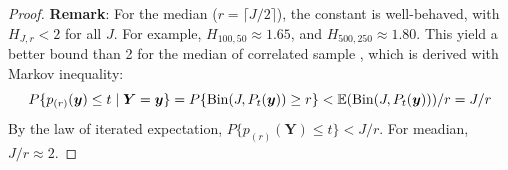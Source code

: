 \documentclass[
  12pt]{article}
\theoremstyle{plain}
\theoremstyle{definition}
\theoremstyle{remark}
\begin{document}
\begin{proof}
\noindent\textbf{Remark}: For the median ($r=\lceil J/2\rceil$), the constant is well-behaved, with $H_{J,r}<2$ for all $J$.  For example, $H_{100,50}\approx 1.65$, and $H_{500,250}\approx 1.80$. This yield a better bound than 2 for the median of correlated sample \citep{johnson_bayesian_2007, yuan_goodness--fit_2012}, which is derived with Markov inequality:
\begin{equation}
    P\{p_{(r)}(\bm{y})\le t \mid \bm{Y}=\bm{y}\} = P\{\mathrm{Bin}(J, P_t(\bm{y})) \ge r\} < \mathbb{E}(\mathrm{Bin}(J, P_t(\bm{y})))/r = J/r
\end{equation}
By the law of iterated expectation, $P\{p_{(r)}(\bm{Y})\le t\} < J/r$. For meadian, $J/r\approx 2$.
\end{proof}



\end{document}
